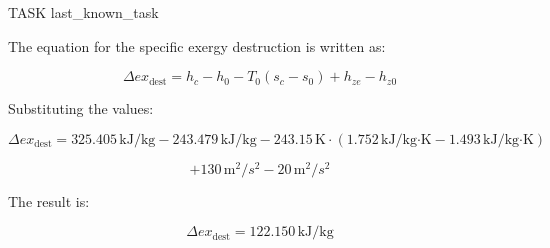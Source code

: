 TASK {last_known_task}

The equation for the specific exergy destruction is written as:

\[
\Delta ex_{\text{dest}} = h_c - h_0 - T_0 (s_c - s_0) + h_{ze} - h_{z0}
\]

Substituting the values:

\[
\Delta ex_{\text{dest}} = 325.405 \, \text{kJ/kg} - 243.479 \, \text{kJ/kg} - 243.15 \, \text{K} \cdot \left(1.752 \, \text{kJ/kg·K} - 1.493 \, \text{kJ/kg·K}\right)
\]

\[
+ 130 \, \text{m}^2/s^2 - 20 \, \text{m}^2/s^2
\]

The result is:

\[
\Delta ex_{\text{dest}} = 122.150 \, \text{kJ/kg}
\]